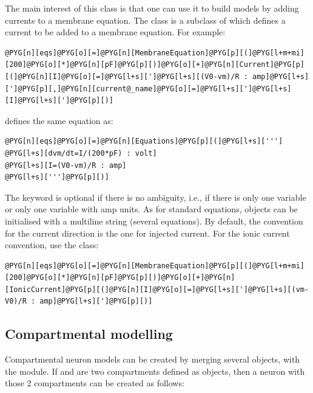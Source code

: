\documentclass[letterpaper,10pt,english]{manual}
\begin{document}
The main interest of this class is that one can use it to build models by adding currents to a membrane
equation. The  class is a subclass of \hyperlink{brian.Equations}{} which defines a current to be added
to a membrane equation. For example:

\begin{Verbatim}[commandchars=@\[\]]
@PYG[n][eqs]@PYG[o][=]@PYG[n][MembraneEquation]@PYG[p][(]@PYG[l+m+mi][200]@PYG[o][*]@PYG[n][pF]@PYG[p][)]@PYG[o][+]@PYG[n][Current]@PYG[p][(]@PYG[n][I]@PYG[o][=]@PYG[l+s][']@PYG[l+s][(V0-vm)/R : amp]@PYG[l+s][']@PYG[p][,]@PYG[n][current@_name]@PYG[o][=]@PYG[l+s][']@PYG[l+s][I]@PYG[l+s][']@PYG[p][)]
\end{Verbatim}

defines the same equation as:

\begin{Verbatim}[commandchars=@\[\]]
@PYG[n][eqs]@PYG[o][=]@PYG[n][Equations]@PYG[p][(]@PYG[l+s][''']
@PYG[l+s][dvm/dt=I/(200*pF) : volt]
@PYG[l+s][I=(V0-vm)/R : amp]
@PYG[l+s][''']@PYG[p][)]
\end{Verbatim}

The keyword  is optional if there is no ambiguity, i.e., if there is only one variable
or only one variable with amp units. As for standard equations,  objects can be initialised with
a multiline string (several equations). By default, the convention for the current direction is the one for injected
current. For the ionic current convention, use the  class:

\begin{Verbatim}[commandchars=@\[\]]
@PYG[n][eqs]@PYG[o][=]@PYG[n][MembraneEquation]@PYG[p][(]@PYG[l+m+mi][200]@PYG[o][*]@PYG[n][pF]@PYG[p][)]@PYG[o][+]@PYG[n][IonicCurrent]@PYG[p][(]@PYG[n][I]@PYG[o][=]@PYG[l+s][']@PYG[l+s][(vm-V0)/R : amp]@PYG[l+s][']@PYG[p][)]
\end{Verbatim}


\subsection{Compartmental modelling}

Compartmental neuron models can be created by merging several  objects,
with the  module. If  and  are two compartments defined as
 objects, then a neuron with those 2 compartments can be created as follows:
\end{document}
